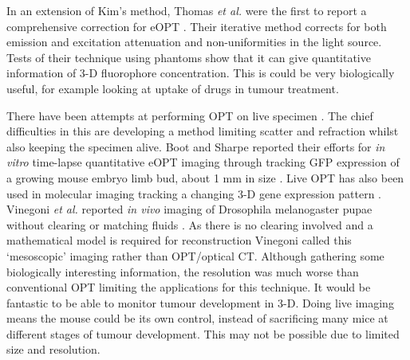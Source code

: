 	In an extension of Kim's method, Thomas \textit{et al.} were the first to report a comprehensive correction for  eOPT \cite{Thomas:2010gt}. Their iterative method corrects for both emission and excitation attenuation and non-uniformities in the light source. 
	Tests of their technique using phantoms show that it can give quantitative information of 3-D fluorophore concentration. This is could be very biologically useful, for example looking at uptake of drugs in tumour treatment. 
	
	
	
	
	
	
	There have been attempts at performing OPT  on live specimen \cite{Boot:2008dt, Vinegoni:2008ix, Colas:2009}. The chief difficulties in this are developing a method limiting scatter and refraction  whilst also keeping the specimen alive. Boot and Sharpe reported their efforts for \textit{in vitro} time-lapse quantitative eOPT  imaging through tracking GFP expression of a growing mouse embryo limb bud, about 1 mm in size \cite{Boot:2008dt}. 
	Live OPT has also been used in molecular imaging tracking a changing 3-D gene expression pattern \cite{Colas:2009}.
	Vinegoni \textit{et al.} reported \textit{in vivo} imaging of Drosophila melanogaster pupae without clearing or matching fluids \cite{Vinegoni:2008ix}.  As there is no clearing involved and a mathematical model is required for reconstruction Vinegoni called this `mesoscopic' imaging rather than OPT/optical CT.  
	Although gathering some biologically interesting information, the resolution was much worse than conventional OPT limiting the applications for this technique. It would be fantastic to be able to monitor tumour development in 3-D. Doing live imaging means the mouse could be its own control, instead of sacrificing many mice at different stages of tumour development. This may not be possible due to limited size and resolution.
	
	
	
	
	
